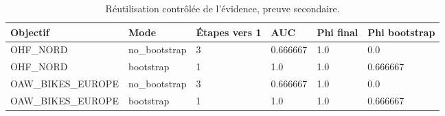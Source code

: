 \begin{table}[t]
\centering
\caption{Réutilisation contrôlée de l'évidence, preuve secondaire.}
\label{tab:v3-secondary-evidence}
\small
\begin{tabular}{p{}p{}p{}p{}p{}p{}}
\hline
Objectif & Mode & Étapes vers 1 & AUC & Phi final & Phi bootstrap \\
\hline
OHF\_NORD & no\_bootstrap & 3 & 0.666667 & 1.0 & 0.0 \\
OHF\_NORD & bootstrap & 1 & 1.0 & 1.0 & 0.666667 \\
OAW\_BIKES\_EUROPE & no\_bootstrap & 3 & 0.666667 & 1.0 & 0.0 \\
OAW\_BIKES\_EUROPE & bootstrap & 1 & 1.0 & 1.0 & 0.666667 \\
\hline
\end{tabular}
\end{table}
